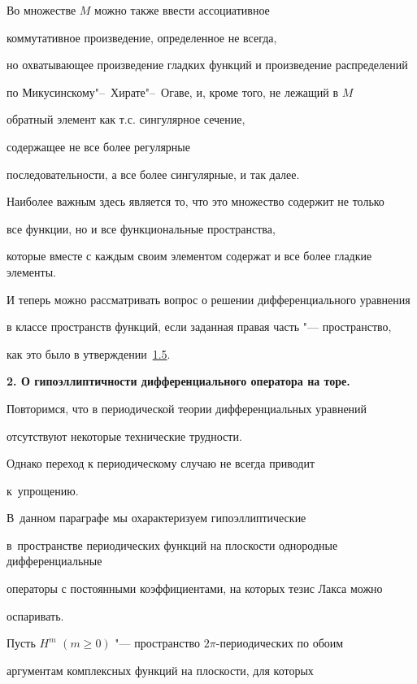 Во множестве $M$ можно также ввести ассоциативное

коммутативное произведение, определенное не всегда,

но охватывающее произведение гладких функций и произведение распределений

по Микусинскому"--~Хирате"--~Огаве, и, кроме того, не лежащий в $M$

обратный элемент как т.с. сингулярное сечение,

содержащее не все более регулярные

последовательности, а все более сингулярные, и так далее.

Наиболее важным здесь является то, что это множество содержит не только

все функции, но и все функциональные пространства,

которые вместе с каждым своим элементом содержат и все более гладкие элементы.

И теперь можно рассматривать вопрос о решении дифференциального уравнения

в классе пространств функций, если заданная правая часть "--- пространство,

как это было в утверждении~\hyperlink{bur:utv1.5}{1.5}.



\smallskip



{\bf 2. О гипоэллиптичности дифференциального оператора на торе.} \linebreak

Повторимся, что в периодической теории дифференциальных уравнений

отсутствуют некоторые технические трудности. 

Однако переход к периодическому случаю не всегда приводит

к~упрощению. 

В~данном параграфе мы охарактеризуем гипоэллиптические

в~пространстве периодических функций на плоскости однородные дифференциальные

операторы с постоянными коэффициентами, на которых тезис Лакса можно

оспаривать.



Пусть $H^m$ $(m \ge 0 )$ "--- пространство $2\pi$-периодических по обоим

аргументам комплексных функций на плоскости, для которых

$$

